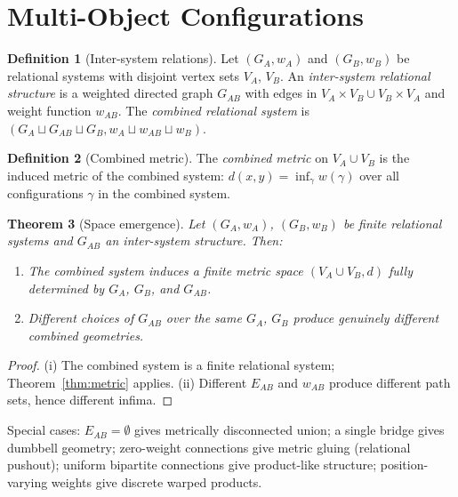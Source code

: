 \documentclass{article}
\newtheorem{theorem}{Theorem}[section]
\theoremstyle{definition}
\newtheorem{definition}[theorem]{Definition}
\theoremstyle{remark}
\begin{document}
\section{Multi-Object Configurations}
\label{sec:multiobject}

\begin{definition}[Inter-system relations]
Let $(G_A, w_A)$ and $(G_B, w_B)$ be relational systems with
disjoint vertex sets $V_A$, $V_B$. An \emph{inter-system
relational structure} is a weighted directed graph $G_{AB}$
with edges in $V_A \times V_B \cup V_B \times V_A$ and weight
function $w_{AB}$. The \emph{combined relational system} is
$(G_A \sqcup G_{AB} \sqcup G_B, w_A \sqcup w_{AB} \sqcup w_B)$.
\end{definition}

\begin{definition}[Combined metric]
The \emph{combined metric} on $V_A \cup V_B$ is the induced
metric of the combined system:
$d(x,y) = \inf_\gamma w(\gamma)$
over all configurations $\gamma$ in the combined system.
\end{definition}

\begin{theorem}[Space emergence]
\label{thm:space_emergence}
Let $(G_A, w_A)$, $(G_B, w_B)$ be finite relational systems and
$G_{AB}$ an inter-system structure. Then:
\begin{enumerate}[label=(\roman*)]
  \item The combined system induces a finite metric space
        $(V_A \cup V_B, d)$ fully determined by $G_A$, $G_B$,
        and $G_{AB}$.
  \item Different choices of $G_{AB}$ over the same $G_A$, $G_B$
        produce genuinely different combined geometries.
\end{enumerate}
\end{theorem}

\begin{proof}
(i) The combined system is a finite relational system;
Theorem~\ref{thm:metric} applies. (ii) Different $E_{AB}$ and
$w_{AB}$ produce different path sets, hence different infima.
\end{proof}

Special cases: $E_{AB} = \emptyset$ gives metrically disconnected
union; a single bridge gives dumbbell geometry; zero-weight
connections give metric gluing (relational pushout); uniform
bipartite connections give product-like structure; position-varying
weights give discrete warped products.
\end{document}
